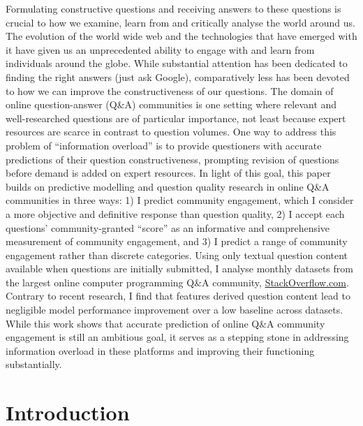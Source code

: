 \documentclass[11pt,preprint, authoryear]{article}
\begin{document}
Formulating constructive questions and receiving answers to these
questions is crucial to how we examine, learn from and critically
analyse the world around us. The evolution of the world wide web and the
technologies that have emerged with it have given us an unprecedented
ability to engage with and learn from individuals around the globe.
While substantial attention has been dedicated to finding the right
answers (just ask Google), comparatively less has been devoted to how we
can improve the constructiveness of our questions. The domain of online
question-answer (Q\&A) communities is one setting where relevant and
well-researched questions are of particular importance, not least
because expert resources are scarce in contrast to question volumes. One
way to address this problem of ``information overload'' is to provide
questioners with accurate predictions of their question
constructiveness, prompting revision of questions before demand is added
on expert resources. In light of this goal, this paper builds on
predictive modelling and question quality research in online Q\&A
communities in three ways: 1) I predict community engagement, which I
consider a more objective and definitive response than question quality,
2) I accept each questions' community-granted ``score'' as an
informative and comprehensive measurement of community engagement, and
3) I predict a range of community engagement rather than discrete
categories. Using only textual question content available when questions
are initially submitted, I analyse monthly datasets from the largest
online computer programming Q\&A community,
\href{https://stackoverflow.com/}{StackOverflow.com}. Contrary to recent
research, I find that features derived question content lead to
negligible model performance improvement over a low baseline across
datasets. While this work shows that accurate prediction of online Q\&A
community engagement is still an ambitious goal, it serves as a stepping
stone in addressing information overload in these platforms and
improving their functioning substantially.

\clearpage


\newpage

\section{\texorpdfstring{Introduction
\label{Intro}}{Introduction }}\label{introduction}
\end{document}
